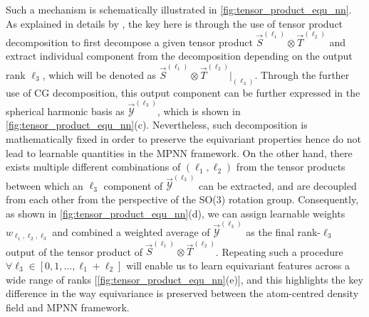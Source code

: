 Such a mechanism is schematically illustrated in \cref{fig:tensor_product_equ_nn}. As explained in details by \citet{duval2023hitchhiker}, the key here is through the use of tensor product decomposition to first decompose a given tensor product $\vec{S}^{(\ell_1)}\otimes\vec{T}^{(\ell_2)}$ and extract individual component from the decomposition depending on the output rank $\ell_3$, which will be denoted as $\vec{S}^{(\ell_1)}\otimes\vec{T}^{(\ell_2)} \vert_{(\ell_3)}$. Through the further use of CG decomposition, this output component can be further expressed in the spherical harmonic basis as $\vec{\mathcal{Y}}^{(\ell_3)}$, which is shown in \cref{fig:tensor_product_equ_nn}(c). Nevertheless, such decomposition is mathematically fixed in order to preserve the equivariant properties hence do not lead to learnable quantities in the MPNN framework. On the other hand, there exists multiple different combinations of $(\ell_1,\ell_2)$ from the tensor products between which an $\ell_3$ component of $\vec{\mathcal{Y}}^{(\ell_3)}$ can be extracted, and are decoupled from each other from the perspective of the SO(3) rotation group. Consequently, as shown in  \cref{fig:tensor_product_equ_nn}(d), we can assign learnable weights $w_{\ell_1,\ell_2,\ell_3}$ and combined a weighted average of $\vec{\mathcal{Y}}^{(\ell_3)}$ as the final rank-$\ell_3$ output of the tensor product of $\vec{S}^{(\ell_1)}\otimes\vec{T}^{(\ell_2)}$. Repeating such a procedure $\forall\ell_3\in[0,1,\ldots,\ell_1+\ell_2]$ will enable us to learn equivariant features across a wide range of ranks [\cref{fig:tensor_product_equ_nn}(e)], and this highlights the key difference in the way equivariance is preserved between the atom-centred density field and MPNN framework.

